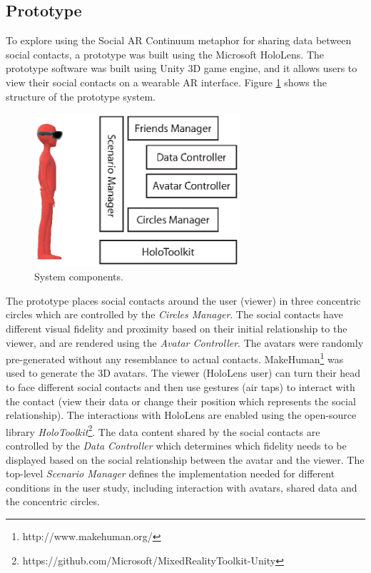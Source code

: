 \subsection{Prototype}

To explore using the Social AR Continuum metaphor for sharing data between social contacts, a prototype was built using the Microsoft HoloLens. The prototype software was built using Unity 3D game engine, and it allows users to view their social contacts on a wearable AR interface. Figure \ref{fig:data:system} shows the structure of the prototype system. 

\begin{figure}[ht]
    \centering
    \includegraphics[width=3in]{images/chi/images-03.eps}
    \caption{System components.}
    \label{fig:data:system}
\end{figure}

The prototype places social contacts around the user (viewer) in three concentric circles which are controlled by the \textit{Circles Manager}. The social contacts have different visual fidelity and proximity based on their initial relationship to the viewer, and are rendered using the \textit{Avatar Controller}. The avatars were randomly pre-generated without any resemblance to actual contacts. MakeHuman\footnote{http://www.makehuman.org/} was used to generate the 3D avatars. The viewer (HoloLens user) can turn their head to face different social contacts and then use gestures (air taps) to interact with the contact (view their data or change their position which represents the social relationship). The interactions with HoloLens are enabled using the open-source library \textit{HoloToolkit}\footnote{https://github.com/Microsoft/MixedRealityToolkit-Unity}. The data content shared by the social contacts are controlled by the \textit{Data Controller} which determines which fidelity needs to be displayed based on the social relationship between the avatar and the viewer. The top-level \textit{Scenario Manager} defines the implementation needed for different conditions in the user study, including interaction with avatars, shared data and the concentric circles. 

